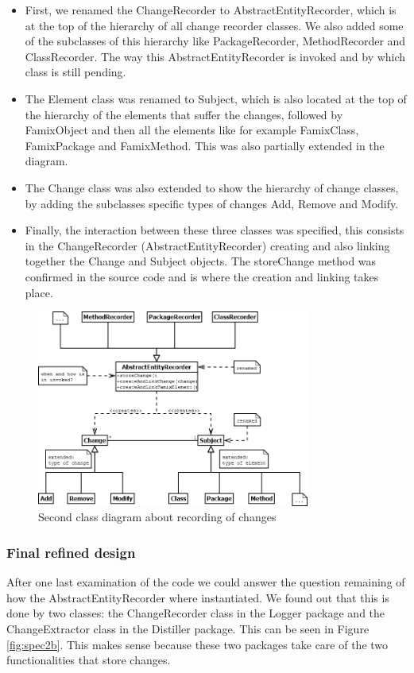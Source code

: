 \documentclass[a4paper]{article}
\begin{document}
\begin{itemize}
\item First, we renamed the ChangeRecorder to AbstractEntityRecorder, which is at the top of the hierarchy of all change recorder classes. We also added some of the subclasses of this hierarchy like PackageRecorder, MethodRecorder and ClassRecorder. The way this AbstractEntityRecorder is invoked and by which class is still pending.

\item The Element class was renamed to Subject, which is also located at the top of the hierarchy of the elements that suffer the changes, followed by FamixObject and then all the elements like for example FamixClass, FamixPackage and FamixMethod. This was also partially extended in the diagram.

\item The Change class was also extended to show the hierarchy of change classes, by adding the subclasses specific types of changes Add, Remove and Modify.

\item Finally, the interaction between these three classes was specified, this consists in the ChangeRecorder (AbstractEntityRecorder) creating and also linking together the Change and Subject objects. The storeChange method was confirmed in the source code and is where the creation and linking takes place.
\end{itemize}

\begin{figure}[h]
\centering
\includegraphics[width=0.8\textwidth]{Images/spec1}
\caption{Second class diagram about recording of changes}
\label{fig:spec1}
\end{figure}

\subsubsection{Final refined design}
After one last examination of the code we could answer the question remaining of how the AbstractEntityRecorder where instantiated. We found out that this is done by two classes: the ChangeRecorder class in the Logger package and the ChangeExtractor class in the Distiller package. This can be seen in Figure \ref{fig:spec2b}. This makes sense because these two packages take care of the two functionalities that store changes.
\end{document}
